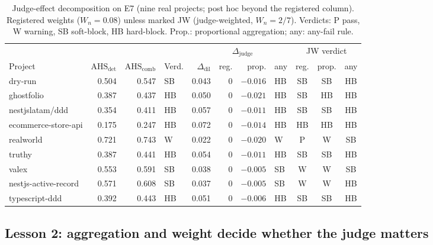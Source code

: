 \documentclass[10pt,a4paper]{article}
\newcommand{\Wn}{W_n}
\newcommand{\ahs}[1]{\mathrm{AHS}_{\mathrm{#1}}}
\begin{document}
\begin{table}[t]
\centering
\small
\caption{Judge-effect decomposition on E7 (nine real projects; post hoc beyond the registered column). Registered
weights ($\Wn = 0.08$) unless marked JW (judge-weighted, $\Wn = 2/7$). Verdicts: P pass, W warning, SB soft-block,
HB hard-block. Prop.: proportional aggregation; any: any-fail rule.}
\label{tab:e7}
\begin{tabular}{@{}lrrlrrrlccc@{}}
\toprule
 & & & & & \multicolumn{2}{c}{$\Delta_\mathrm{judge}$} & & \multicolumn{3}{c}{JW verdict} \\
\cmidrule(lr){6-7}\cmidrule(lr){9-11}
Project & $\ahs{det}$ & $\ahs{comb}$ & Verd. & $\Delta_\mathrm{dil}$ & reg. & prop. & any & reg. & prop. & any \\
\midrule
dry-run              & 0.504 & 0.547 & SB & 0.043 & 0 & $-0.016$ & HB & SB & SB & HB \\
ghostfolio           & 0.387 & 0.437 & HB & 0.050 & 0 & $-0.021$ & HB & SB & HB & HB \\
nestjslatam/ddd      & 0.354 & 0.411 & HB & 0.057 & 0 & $-0.011$ & HB & SB & SB & HB \\
ecommerce-store-api  & 0.175 & 0.247 & HB & 0.072 & 0 & $-0.014$ & HB & HB & HB & HB \\
realworld            & 0.721 & 0.743 & W  & 0.022 & 0 & $-0.020$ & W  & P  & W  & SB \\
truthy               & 0.387 & 0.441 & HB & 0.054 & 0 & $-0.011$ & HB & SB & SB & HB \\
valex                & 0.553 & 0.591 & SB & 0.038 & 0 & $-0.005$ & SB & W  & W  & SB \\
nestjs-active-record & 0.571 & 0.608 & SB & 0.037 & 0 & $-0.005$ & SB & W  & W  & HB \\
typescript-ddd       & 0.392 & 0.443 & HB & 0.051 & 0 & $-0.006$ & HB & SB & SB & HB \\
\bottomrule
\end{tabular}
\end{table}

\subsection{Lesson 2: aggregation and weight decide whether the judge matters}\label{sec:l2}
\end{document}
